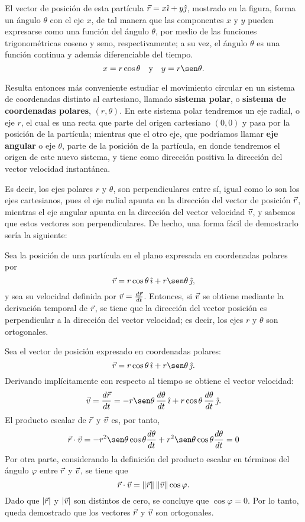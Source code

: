 El vector de posición de esta partícula $\vec{r} = x\hat{\imath}+ y\hat{\jmath}$, mostrado en la figura, forma un ángulo $\theta$ con el eje $x$, de tal manera que las componentes $x$ y $y$ pueden expresarse como una función del ángulo $\theta$, por medio de las funciones trigonométricas coseno y seno, respectivamente; a su vez, el ángulo $\theta$ es una función continua y además diferenciable del tiempo.
$$x = r\cos\theta \quad \text{y} \quad y = r\sen\theta.$$

Resulta entonces más conveniente estudiar el movimiento circular en un sistema de coordenadas distinto al cartesiano, llamado \textbf{sistema polar}, o \textbf{sistema de coordenadas polares}, $(r, \theta)$. En este sistema polar tendremos un eje radial, o eje $r$, el cual es una recta que parte del origen cartesiano $(0,0)$ y pasa por la posición de la partícula; mientras que el otro eje, que podríamos llamar \textbf{eje angular} o eje $\theta$, parte de la posición de la partícula, en donde tendremos el origen de este nuevo sistema, y tiene como dirección positiva la dirección del vector velocidad instantánea.

Es decir, los ejes polares $r$ y $\theta$, son perpendiculares entre sí, igual como lo son los ejes cartesianos, pues el eje radial apunta en la dirección del vector de posición $\vec{r}$, mientras el eje angular apunta en la dirección del vector velocidad $\vec{v}$, y sabemos que estos vectores son perpendiculares. De hecho, una forma fácil de demostrarlo sería la siguiente:
\begin{proposition}{}{}
    Sea la posición de una partícula en el plano expresada en coordenadas polares por
    $$\vecr = r\cos\theta\,\veci + r\sen\theta\,\vecj,$$
    y sea su velocidad definida por $\vec{v} = \frac{d\vec{r}}{dt}$. Entonces, si $\vec{v}$ se obtiene mediante la derivación temporal de $\vec{r}$, se tiene que la dirección del vector posición es perpendicular a la dirección del vector velocidad; es decir, los ejes $r$ y $\theta$ son ortogonales.
    \begin{demo}
        Sea el vector de posición expresado en coordenadas polares:
        $$\vecr = r\cos\theta\,\veci + r\sen\theta\,\vecj.$$
        Derivando implícitamente con respecto al tiempo se obtiene el vector velocidad:
        $$\veloi = \frac{d\vecr}{dt} = -r\sen\theta\,\frac{d\theta}{dt}\,\veci + r\cos\theta\,\frac{d\theta}{dt}\,\vecj.$$
        El producto escalar de $\vec{r}$ y $\vec{v}$ es, por tanto,
        $$\vecr \cdot \veloi = -r^2\sen\theta\cos\theta\frac{d\theta}{dt} + r^2\sen\theta\cos\theta\frac{d\theta}{dt} = 0$$
        Por otra parte, considerando la definición del producto escalar en términos del ángulo $\varphi$ entre $\vec{r}$ y $\vec{v}$, se tiene que
        $$\vec{r}\cdot\vec{v} = \|\vec{r}\|\,\|\vec{v}\|\cos\varphi.$$
        Dado que $|\vec{r}|$ y $|\vec{v}|$ son distintos de cero, se concluye que $\cos\varphi=0$. Por lo tanto, queda demostrado que los vectores $\vec{r}$ y $\vec{v}$ son ortogonales.
    \end{demo}
\end{proposition}

